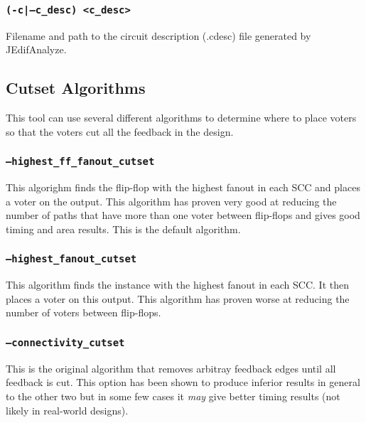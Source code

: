 \subsubsection{\texttt{(-c|--c\_desc) <c\_desc>}}
Filename and path to the circuit description (.cdesc) file generated by
JEdifAnalyze.

\subsection{Cutset Algorithms}
This tool can use several different algorithms to determine where to place
voters so that the voters cut all the feedback in the design. 

\subsubsection{\texttt{--highest\_ff\_fanout\_cutset}}
This algorighm finds the flip-flop with the highest fanout in each SCC and 
places a voter on the output. This algorithm has proven very good at reducing 
the number of paths that have more than one voter between flip-flops and gives
good timing and area results. This is the default algorithm.

\subsubsection{\texttt{--highest\_fanout\_cutset}}
This algorithm finds the instance with the highest fanout in each SCC.
It then places a voter on this output. This algorithm has proven worse 
at reducing the number of voters between flip-flops.

\subsubsection{\texttt{--connectivity\_cutset}}
This is the original algorithm that removes arbitray feedback edges until all
feedback is cut. This option has been shown to produce inferior results in
general to the other two but in some few cases it \emph{may} give better timing
results (not likely in real-world designs).




